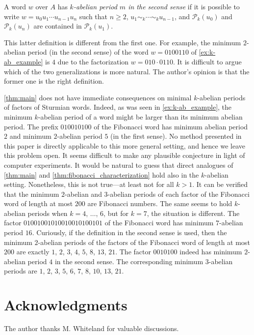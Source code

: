 \documentclass[a4paper,fleqn]{article}
\newcommand{\Parikh}[2][]{\mathcal{P}_{#1}(#2)}
\begin{document}
  \begin{definition}
    A word $w$ over $A$ has \emph{$k$-abelian period $m$ in the second sense} if it is possible to write
    $w = u_0 u_1 \cdots u_{n-1} u_n$ such that $n \geq 2$, $u_1 \sim_k \cdots \sim_k u_{n-1}$, and $\Parikh[k]{u_0}$
    and $\Parikh[k]{u_n}$ are contained in $\Parikh[k]{u_1}$.
  \end{definition}

  This latter definition is different from the first one. For example, the minimum $2$-abelian period (in the second
  sense) of the word $w = 0100110$ of \autoref{ex:k-ab_example} is $4$ due to the factorization $w = 010 \cdot 0110$.
  It is difficult to argue which of the two generalizations is more natural. The author's opinion is that the former
  one is the right definition.

  \autoref{thm:main} does not have immediate consequences on minimal $k$-abelian periods of factors of Sturmian words.
  Indeed, as was seen in \autoref{ex:k-ab_example}, the minimum $k$-abelian period of a word might be larger than its
  minimum abelian period. The prefix $010010100$ of the Fibonacci word has minimum abelian period $2$ and minimum
  $2$-abelian period $5$ (in the first sense). No method presented in this paper is directly applicable to this more
  general setting, and hence we leave this problem open. It seems difficult to make any plausible conjecture in light
  of computer experiments. It would be natural to guess that direct analogues of \autoref{thm:main} and
  \autoref{thm:fibonacci_characterization} hold also in the $k$-abelian setting. Nonetheless, this is not true---at
  least not for all $k > 1$. It can be verified that the minimum $2$-abelian and $3$-abelian periods of each factor of
  the Fibonacci word of length at most $200$ are Fibonacci numbers. The same seems to hold $k$-abelian periods when
  $k = 4$, $\ldots$, $6$, but for $k = 7$, the situation is different. The factor $01001001010010010100101$ of the
  Fibonacci word has minimum $7$-abelian period $16$. Curiously, if the definition in the second sense is used, then
  the minimum $2$-abelian periods of the factors of the Fibonacci word of length at most $200$ are exactly $1$, $2$,
  $3$, $4$, $5$, $8$, $13$, $21$. The factor $0010100$ indeed has minimum $2$-abelian period $4$ in the second sense.
  The corresponding minimum $3$-abelian periods are $1$, $2$, $3$, $5$, $6$, $7$, $8$, $10$, $13$, $21$.

  \section*{Acknowledgments}
  The author thanks M. Whiteland for valuable discussions.

  \printbibliography
  
\end{document}
